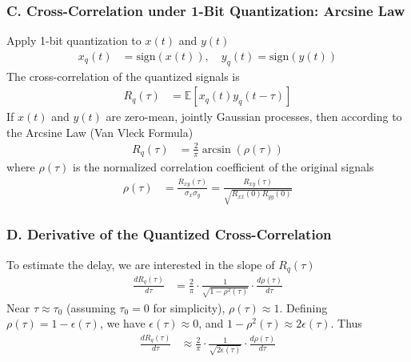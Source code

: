 \documentclass{article}
\begin{document}
	\subsubsection*{C. Cross-Correlation under 1-Bit Quantization: Arcsine Law}
	Apply 1-bit quantization to $x(t)$ and $y(t)$
	\begin{align}
		x_q(t) &= \text{sign}(x(t)), \quad y_q(t) = \text{sign}(y(t)) 
	\end{align}
	The cross-correlation of the quantized signals is
	\begin{align}
		R_q(\tau) &= \mathbb{E}[x_q(t)y_q(t-\tau)] 
	\end{align}
	If $x(t)$ and $y(t)$ are zero-mean, jointly Gaussian processes, then according to the Arcsine Law (Van Vleck Formula)
	\begin{align}
		R_q(\tau) &= \frac{2}{\pi} \arcsin(\rho(\tau)) 
	\end{align}
	where $\rho(\tau)$ is the normalized correlation coefficient of the original signals
	\begin{align}
		\rho(\tau) &= \frac{R_{xy}(\tau)}{\sigma_x\sigma_y} = \frac{R_{xy}(\tau)}{\sqrt{R_{xx}(0)R_{yy}(0)}} 
	\end{align}
	
	\subsubsection*{D. Derivative of the Quantized Cross-Correlation}
	To estimate the delay, we are interested in the slope of $R_q(\tau)$
	\begin{align}
		\frac{dR_q(\tau)}{d\tau} &= \frac{2}{\pi} \cdot \frac{1}{\sqrt{1 - \rho^2(\tau)}} \cdot \frac{d\rho(\tau)}{d\tau} 
	\end{align}
	Near $\tau \approx \tau_0$ (assuming $\tau_0=0$ for simplicity), $\rho(\tau) \approx 1$. Defining $\rho(\tau) = 1 - \epsilon(\tau)$, we have $\epsilon(\tau) \approx 0$, and $1 - \rho^2(\tau) \approx 2\epsilon(\tau)$. Thus
	\begin{align}
		\frac{dR_q(\tau)}{d\tau} &\approx \frac{2}{\pi} \cdot \frac{1}{\sqrt{2\epsilon(\tau)}} \cdot \frac{d\rho(\tau)}{d\tau} 
	\end{align}
	
\end{document}
